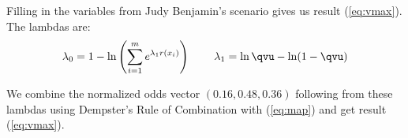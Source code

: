 Filling in the variables from Judy Benjamin's scenario gives us result
({\ref{eq:vmax}}). The lambdas are:
  \begin{displaymath}
    \lambda_{0}=1-\ln\left(\sum_{i=1}^{m}e^{\lambda_{1}r(x_{i})}\right)\hspace{.3in}
    \lambda_{1}=\ln{}{\qvu}-\ln(1-{\qvu})\notag
  \end{displaymath}

  We combine the normalized odds vector $(0.16,0.48,0.36)$ following
  from these lambdas using Dempster's Rule of Combination with
  ({\ref{eq:map}}) and get result ({\ref{eq:vmax}}).